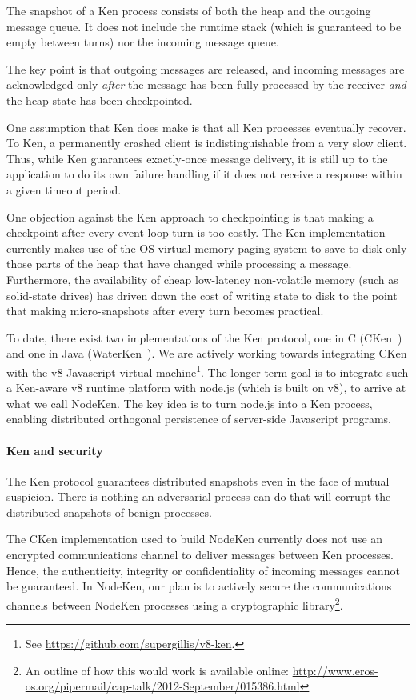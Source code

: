 \documentclass{llncs}
\begin{document}
The snapshot of a Ken process consists of both the heap and the outgoing message queue. It does not include the runtime stack (which is guaranteed to be empty between turns) nor the incoming message queue.

The key point is that outgoing messages are released, and incoming messages are acknowledged only \emph{after} the message has been fully processed by the receiver \emph{and} the heap state has been checkpointed.

One assumption that Ken does make is that all Ken processes eventually recover. To Ken, a permanently crashed client is indistinguishable from a very slow client. Thus, while Ken guarantees exactly-once message delivery, it is still up to the application to do its own failure handling if it does not receive a response within a given timeout period.

One objection against the Ken approach to checkpointing is that making a checkpoint after every event loop turn is too costly. The Ken implementation currently makes use of the OS virtual memory paging system to save to disk only those parts of the heap that have changed while processing a message. Furthermore, the availability of cheap low-latency non-volatile memory (such as solid-state drives) has driven down the cost of writing state to disk to the point that making micro-snapshots after every turn becomes practical.

To date, there exist two implementations of the Ken protocol, one in C (CKen~\cite{Yoo:CKen}) and one in Java (WaterKen~\cite{waterken}). We are actively working towards integrating CKen with the v8 Javascript virtual machine\footnote{See \url{https://github.com/supergillis/v8-ken}.}. The longer-term goal is to integrate such a Ken-aware v8 runtime platform with node.js (which is built on v8), to arrive at what we call NodeKen. The key idea is to turn node.js into a Ken process, enabling distributed orthogonal persistence of server-side Javascript programs.

\paragraph{Ken and security}
The Ken protocol guarantees distributed snapshots even in the face of mutual suspicion. There is nothing an adversarial process can do that will corrupt the distributed snapshots of benign processes.

The CKen implementation used to build NodeKen currently does not use an encrypted communications channel to deliver messages between Ken processes. Hence, the authenticity, integrity or confidentiality of incoming messages cannot be guaranteed. In NodeKen, our plan is to actively secure the communications channels between NodeKen processes using a cryptographic library\footnote{An outline of how this would work is available online: \url{http://www.eros-os.org/pipermail/cap-talk/2012-September/015386.html}}.
\end{document}
